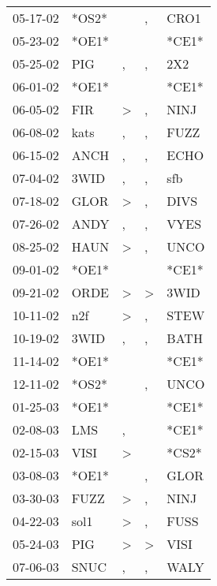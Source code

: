 \begin{supertabular}{lllll}
 05-17-02 &  *OS2* &               &             , &   CRO1 \\
 05-23-02 &  *OE1* &               &               &  *CE1* \\
 05-25-02 &    PIG &             , &             , &    2X2 \\
 06-01-02 &  *OE1* &               &               &  *CE1* \\
 06-05-02 &    FIR &  \textgreater &             , &   NINJ \\
 06-08-02 &   kats &             , &             , &   FUZZ \\
 06-15-02 &   ANCH &             , &             , &   ECHO \\
 07-04-02 &   3WID &             , &             , &    sfb \\
 07-18-02 &   GLOR &  \textgreater &             , &   DIVS \\
 07-26-02 &   ANDY &             , &             , &   VYES \\
 08-25-02 &   HAUN &  \textgreater &             , &   UNCO \\
 09-01-02 &  *OE1* &               &               &  *CE1* \\
 09-21-02 &   ORDE &  \textgreater &  \textgreater &   3WID \\
 10-11-02 &    n2f &  \textgreater &             , &   STEW \\
 10-19-02 &   3WID &             , &             , &   BATH \\
 11-14-02 &  *OE1* &               &               &  *CE1* \\
 12-11-02 &  *OS2* &               &             , &   UNCO \\
 01-25-03 &  *OE1* &               &               &  *CE1* \\
 02-08-03 &    LMS &             , &               &  *CE1* \\
 02-15-03 &   VISI &  \textgreater &               &  *CS2* \\
 03-08-03 &  *OE1* &               &             , &   GLOR \\
 03-30-03 &   FUZZ &  \textgreater &             , &   NINJ \\
 04-22-03 &   sol1 &  \textgreater &             , &   FUSS \\
 05-24-03 &    PIG &  \textgreater &  \textgreater &   VISI \\
 07-06-03 &   SNUC &             , &             , &   WALY \\

\end{supertabular}
